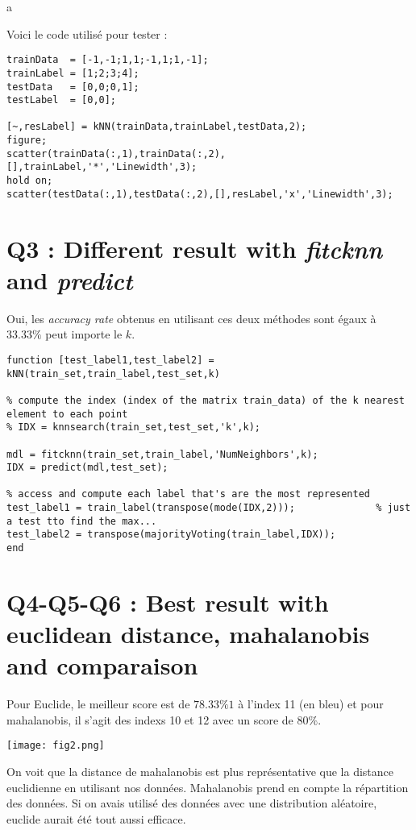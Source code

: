 a \documentclass[a4paper,11pt]{report}
\begin{document}
Voici le code utilisé pour tester :
\begin{lstlisting}
trainData  = [-1,-1;1,1;-1,1;1,-1];
trainLabel = [1;2;3;4];
testData   = [0,0;0,1];
testLabel  = [0,0];

[~,resLabel] = kNN(trainData,trainLabel,testData,2);
figure;
scatter(trainData(:,1),trainData(:,2),[],trainLabel,'*','Linewidth',3);
hold on;
scatter(testData(:,1),testData(:,2),[],resLabel,'x','Linewidth',3);
\end{lstlisting}

\section*{Q3 : Different result with \textit{fitcknn} and \textit{predict}}
Oui, les \textit{accuracy rate} obtenus en utilisant ces deux méthodes sont égaux à $33.33\%$ peut importe le $k$.
\begin{lstlisting}
function [test_label1,test_label2] = kNN(train_set,train_label,test_set,k)

% compute the index (index of the matrix train_data) of the k nearest element to each point 
% IDX = knnsearch(train_set,test_set,'k',k);

mdl = fitcknn(train_set,train_label,'NumNeighbors',k);
IDX = predict(mdl,test_set);

% access and compute each label that's are the most represented
test_label1 = train_label(transpose(mode(IDX,2)));              % just a test tto find the max...
test_label2 = transpose(majorityVoting(train_label,IDX));
end
\end{lstlisting}

\section*{Q4-Q5-Q6 : Best result with euclidean distance, mahalanobis and comparaison}

Pour Euclide, le meilleur score est de $78.33\%1$ à l'index 11 (en bleu) et pour mahalanobis, il s'agit des indexs 10 et 12 
avec un score de $80\%$.

\begin{center}
    \texttt{[image: fig2.png]}
\end{center}

On voit que la distance de mahalanobis est plus représentative que la distance euclidienne en utilisant nos données. Mahalanobis 
prend en compte la répartition des données. Si on avais utilisé des données avec une distribution aléatoire, euclide aurait été 
tout aussi efficace.
\end{document}
